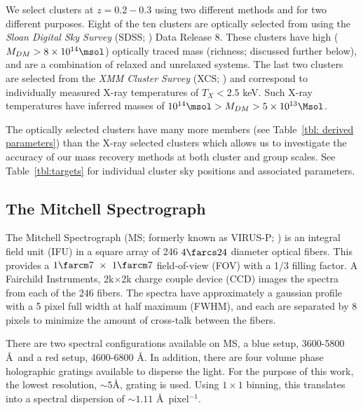 We select clusters at $z=0.2-0.3$ using two different methods and for two different purposes. Eight of the ten clusters are optically selected from \cite{Rykoff2012} using the \textit{Sloan Digital Sky Survey} (SDSS; \citealt{Blanton2001a}) Data Release 8. These clusters have high ($M_{DM} > 8\times10^{14}\msol$) optically traced mass (richness; discussed further below), and are a combination of relaxed and unrelaxed systems. The last two clusters are selected from the \textit{XMM Cluster Survey} (XCS; \citealt{Mehrtens2012}) and correspond to individually measured X-ray temperatures of $T_X < 2.5$ keV. Such X-ray temperatures have inferred masses of $10^{14}\msol > M_{DM} > 5\times10^{13}\Msol$.

The optically selected clusters have many more members (see Table~\ref{tbl: derived parameters}) than the X-ray selected clusters which allows us to investigate the accuracy of our mass recovery methods at both cluster and group scales. See Table~\ref{tbl:targets} for individual cluster sky positions and associated parameters. 

\subsection{The Mitchell Spectrograph} 
The Mitchell Spectrograph (MS; formerly known as VIRUS-P; \citealt{Hill2008a}) is an integral field unit (IFU) in a square array of 246 $4\farcs24$ diameter optical fibers. This provides a $1\farcm7~\times~1\farcm7$ field-of-view (FOV) with a 1/3 filling factor. A Fairchild Instruments, 2k$\times$2k charge couple device (CCD) images the spectra from each of the 246 fibers. The spectra have approximately a gaussian profile with a 5 pixel full width at half maximum (FWHM), and each are separated by 8 pixels to minimize the amount of cross-talk between the fibers. 

There are two spectral configurations available on MS, a blue setup, 3600-5800 \AA\ and a red setup, 4600-6800 \AA. In addition, there are four volume phase holographic gratings available to disperse the light. For the purpose of this work, the lowest resolution, $\sim5$\AA, grating is used. Using $1\times1$ binning, this translates into a spectral dispersion of $\sim1.11$ \AA\ pixel$^{-1}$. 

